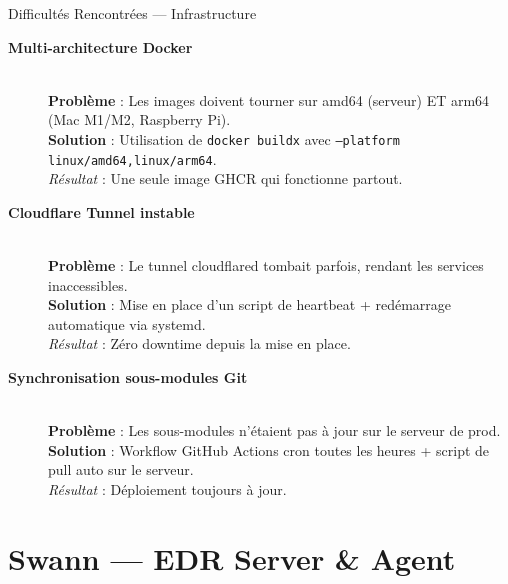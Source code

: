 \documentclass[xcolor=dvipsnames, aspectratio=169, 10pt]{beamer}
\begin{document}
\begin{frame}{Difficultés Rencontrées — Infrastructure}
  \begin{description}
    \item[\textbf{Multi-architecture Docker}] \hfill \\
      \textbf{Problème} : Les images doivent tourner sur amd64 (serveur) ET arm64 (Mac M1/M2, Raspberry Pi). \\
      \textbf{Solution} : Utilisation de \texttt{docker buildx} avec \texttt{--platform linux/amd64,linux/arm64}. \\
      \textit{Résultat} : Une seule image GHCR qui fonctionne partout.
    \item[\textbf{Cloudflare Tunnel instable}] \hfill \\
      \textbf{Problème} : Le tunnel cloudflared tombait parfois, rendant les services inaccessibles. \\
      \textbf{Solution} : Mise en place d'un script de heartbeat + redémarrage automatique via systemd. \\
      \textit{Résultat} : Zéro downtime depuis la mise en place.
    \item[\textbf{Synchronisation sous-modules Git}] \hfill \\
      \textbf{Problème} : Les sous-modules n'étaient pas à jour sur le serveur de prod. \\
      \textbf{Solution} : Workflow GitHub Actions cron toutes les heures + script de pull auto sur le serveur. \\
      \textit{Résultat} : Déploiement toujours à jour.
  \end{description}
\end{frame}

\section{Swann — EDR Server \& Agent}
\end{document}
